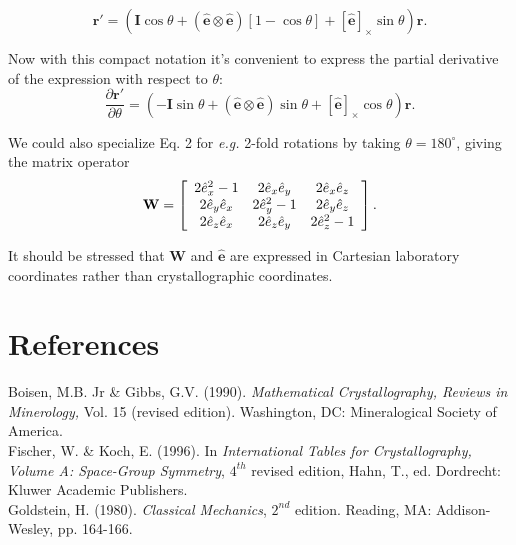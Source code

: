 \documentclass[12pt, letterpaper]{article}
\begin{document}
  \begin{equation}
   \mathbf{r'} = (\mathbf{I} \cos \theta +
   (\mathbf{\hat{e}\otimes\hat{e}})
   \left[ 1 - \cos \theta \right] +
    \left[
      \mathbf{\hat{e}}
    \right]_{\times} \sin \theta)\mathbf{r}
    \text{.}
    \label{eqn:sabbrev}
  \end{equation}


  Now with this compact notation it's convenient to express the partial derivative of
  the expression with respect to $\theta$:
  \begin{equation}
    \frac{\partial \mathbf{r'}}{\partial \theta} =
     (-\mathbf{I} \sin \theta +
   (\mathbf{\hat{e}\otimes\hat{e}})
     \sin \theta  +
    \left[
      \mathbf{\hat{e}}
    \right]_{\times} \cos \theta)\mathbf{r}
    \text{.}
    \label{eqn:gradient}
  \end{equation}

  We could also specialize Eq. 2 for \textit{e.g.} 2-fold rotations by taking $\theta=180^\circ$,
  giving the matrix operator
  \begin{equation}
    \mathbf{W} =
    \left[
    \begin{array}{c c c}
       2\hat{e}_{x}^{2}-1  & 2\hat{e}_{x}\hat{e}_{y} & 2\hat{e}_{x}\hat{e}_{z} \\
       2\hat{e}_{y}\hat{e}_{x}  & 2\hat{e}_{y}^{2}-1 & 2\hat{e}_{y}\hat{e}_{z} \\
       2\hat{e}_{z}\hat{e}_{x}  & 2\hat{e}_{z}\hat{e}_{y} & 2\hat{e}_{z}^{2}-1 \\
    \end{array}
    \right]
    \text{.}
    \label{eqn:gradient_of_rc}
  \end{equation}

  It should be stressed that $\mathbf{W}$ and $\mathbf{\hat{e}}$ are expressed in Cartesian laboratory
  coordinates rather than crystallographic coordinates.

\section{References}
\setlength{\parindent}{0cm}

  Boisen, M.B. Jr \& Gibbs, G.V. (1990).  \textit{Mathematical Crystallography, Reviews in Minerology,}
  Vol. 15 (revised edition).  Washington, DC: Mineralogical Society of America.
  \\
  \newline
  Fischer, W. \& Koch, E. (1996).  In \textit{International Tables for Crystallography, Volume A:
  Space-Group Symmetry}, $4^{th}$ revised edition, Hahn, T., ed.  Dordrecht: Kluwer Academic Publishers.
  \\
  \newline
  Goldstein, H. (1980).  \textit{Classical Mechanics}, $2^{nd}$ edition.  Reading, MA: Addison-Wesley,
  pp. 164-166.

  
\end{document}
